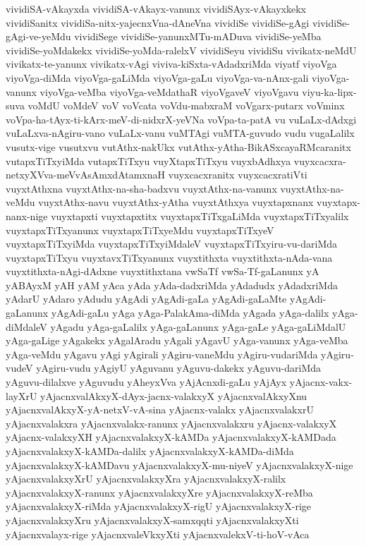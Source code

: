 {vividiSA-vAkayxda
vividiSA-vAkayx-vanunx
vividiSAyx-vAkayxkekx
vividiSanitx
vividiSa-nitx-yajecnxVna-dAneVna
vividiSe
vividiSe-gAgi
vividiSe-gAgi-ve-yeMdu
vividiSege
vividiSe-yanunxMTu-mADuva
vividiSe-yeMba
vividiSe-yoMdakekx
vividiSe-yoMda-ralelxV
vividiSeyu
vividiSu
vivikatx-neMdU
vivikatx-te-yanunx
vivikatx-vAgi
viviva-kiSxta-vAdadxriMda
viyatf
viyoVga
viyoVga-diMda
viyoVga-gaLiMda
viyoVga-gaLu
viyoVga-va-nAnx-gali
viyoVga-vanunx
viyoVga-veMba
viyoVga-veMdathaR
viyoVgaveV
viyoVgavu
viyu-ka-lipx-suva
voMdU
voMdeV
voV
voVcata
voVdu-mabxraM
voVgarx-putarx
voVminx
voVpa-ha-tAyx-ti-kArx-meV-di-nidxrX-yeVNa
voVpa-ta-patA
vu
vuLaLx-dAdxgi
vuLaLxva-nAgiru-vano
vuLaLx-vanu
vuMTAgi
vuMTA-guvudo
vudu
vugaLalilx
vusutx-vige
vusutxvu
vutAthx-nakUkx
vutAthx-yAtha-BikASxcayaRMcaranitx
vutapxTiTxyiMda
vutapxTiTxyu
vuyXtapxTiTxyu
vuyxbAdhxya
vuyxcacxra-netxyXVva-meVvAsAmxdAtamxnaH
vuyxcacxranitx
vuyxcacxratiVti
vuyxtAthxna
vuyxtAthx-na-sha-badxvu
vuyxtAthx-na-vanunx
vuyxtAthx-na-veMdu
vuyxtAthx-navu
vuyxtAthx-yAtha
vuyxtAthxya
vuyxtapxnanx
vuyxtapx-nanx-nige
vuyxtapxti
vuyxtapxtitx
vuyxtapxTiTxgaLiMda
vuyxtapxTiTxyalilx
vuyxtapxTiTxyanunx
vuyxtapxTiTxyeMdu
vuyxtapxTiTxyeV
vuyxtapxTiTxyiMda
vuyxtapxTiTxyiMdaleV
vuyxtapxTiTxyiru-vu-dariMda
vuyxtapxTiTxyu
vuyxtavxTiTxyanunx
vuyxtithxta
vuyxtithxta-nAda-vana
vuyxtithxta-nAgi-dAdxne
vuyxtithxtana
vwSaTf
vwSa-Tf-gaLanunx
yA
yABAyxM
yAH
yAM
yAca
yAda
yAda-dadxriMda
yAdadudx
yAdadxriMda
yAdarU
yAdaro
yAdudu
yAgAdi
yAgAdi-gaLa
yAgAdi-gaLaMte
yAgAdi-gaLanunx
yAgAdi-gaLu
yAga
yAga-PalakAma-diMda
yAgada
yAga-dalilx
yAga-diMdaleV
yAgadu
yAga-gaLalilx
yAga-gaLanunx
yAga-gaLe
yAga-gaLiMdalU
yAga-gaLige
yAgakekx
yAgalAradu
yAgali
yAgavU
yAga-vanunx
yAga-veMba
yAga-veMdu
yAgavu
yAgi
yAgirali
yAgiru-vaneMdu
yAgiru-vudariMda
yAgiru-vudeV
yAgiru-vudu
yAgiyU
yAguvanu
yAguvu-dakekx
yAguvu-dariMda
yAguvu-dilalxve
yAguvudu
yAheyxVva
yAjAcnxdi-gaLu
yAjAyx
yAjacnx-vakx-layXrU
yAjacnxvalAkxyX-dAyx-jacnx-valakxyX
yAjacnxvalAkxyXnu
yAjacnxvalAkxyX-yA-netxV-vA-sina
yAjacnx-valakx
yAjacnxvalakxrU
yAjacnxvalakxra
yAjacnxvalakx-ranunx
yAjacnxvalakxru
yAjacnx-valakxyX
yAjacnx-valakxyXH
yAjacnxvalakxyX-kAMDa
yAjacnxvalakxyX-kAMDada
yAjacnxvalakxyX-kAMDa-dalilx
yAjacnxvalakxyX-kAMDa-diMda
yAjacnxvalakxyX-kAMDavu
yAjacnxvalakxyX-mu-niyeV
yAjacnxvalakxyX-nige
yAjacnxvalakxyXrU
yAjacnxvalakxyXra
yAjacnxvalakxyX-ralilx
yAjacnxvalakxyX-ranunx
yAjacnxvalakxyXre
yAjacnxvalakxyX-reMba
yAjacnxvalakxyX-riMda
yAjacnxvalakxyX-rigU
yAjacnxvalakxyX-rige
yAjacnxvalakxyXru
yAjacnxvalakxyX-samxqqti
yAjacnxvalakxyXti
yAjacnxvalayx-rige
yAjacnxvaleVkxyXti
yAjacnxvalekxV-ti-hoV-vAca
}

